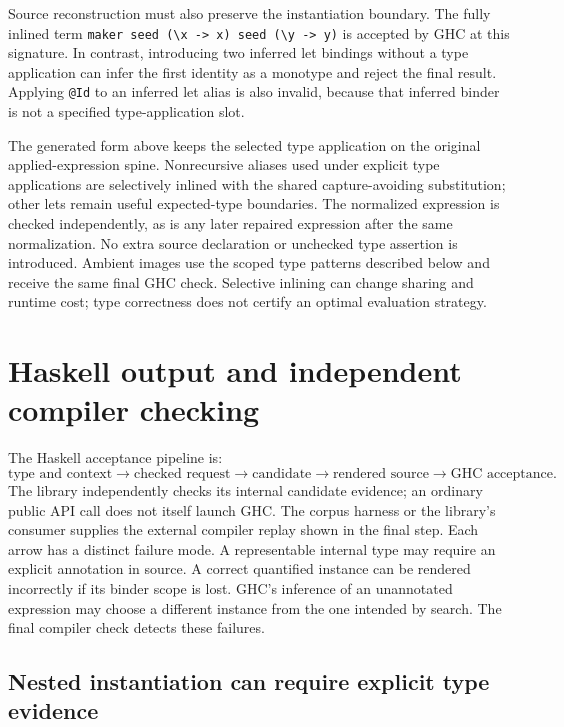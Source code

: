 \documentclass[11pt]{article}
\newcommand{\code}[1]{\texttt{#1}}
\begin{document}
Source reconstruction must also preserve the instantiation boundary. The
fully inlined term \code{maker seed (\textbackslash x -> x) seed
(\textbackslash y -> y)} is accepted by GHC at this signature. In contrast,
introducing two inferred let bindings without a type application can infer
the first identity as a monotype and reject the final result. Applying
\code{@Id} to an inferred let alias is also invalid, because that inferred
binder is not a specified type-application slot.

The generated form above keeps the selected type application on the original
applied-expression spine. Nonrecursive aliases used under explicit type
applications are selectively inlined with the shared capture-avoiding
substitution; other lets remain useful expected-type boundaries. The
normalized expression is checked independently, as is any later repaired
expression after the same normalization. No extra source declaration or
unchecked type assertion is introduced. Ambient images use the scoped type
patterns described below and receive the same final GHC check. Selective
inlining can change sharing and runtime cost; type correctness does not certify
an optimal evaluation strategy.

\section{Haskell output and independent compiler checking}

The Haskell acceptance pipeline is:
\[
 \text{type and context}
 \longrightarrow \text{checked request}
 \longrightarrow \text{candidate}
 \longrightarrow \text{rendered source}
 \longrightarrow \text{GHC acceptance}.
\]
The library independently checks its internal candidate evidence; an ordinary
public API call does not itself launch GHC. The corpus harness or the library's
consumer supplies the external compiler replay shown in the final step.
Each arrow has a distinct failure mode. A representable internal type may
require an explicit annotation in source. A correct quantified instance can
be rendered incorrectly if its binder scope is lost. GHC's inference of an
unannotated expression may choose a different instance from the one intended
by search. The final compiler check detects these failures.

\subsection{Nested instantiation can require explicit type evidence}
\end{document}
